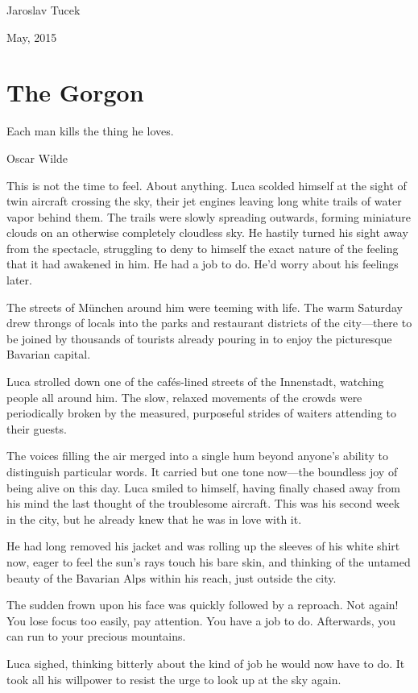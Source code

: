 \hfill Jaroslav Tucek

\hfill May, 2015

\chapter{The Gorgon}

\epigraph{Each man kills the thing he loves.}{Oscar Wilde}

\firstparagraph

This is not the time to feel. About anything. Luca scolded himself at the sight of twin aircraft crossing the sky, their jet engines leaving long white trails of water vapor behind them. The trails were slowly spreading outwards, forming miniature clouds on an otherwise completely cloudless sky. He hastily turned his sight away from the spectacle, struggling to deny to himself the exact nature of the feeling that it had awakened in him. He had a job to do. He'd worry about his feelings later.

The streets of München around him were teeming with life. The warm Saturday drew throngs of locals into the parks and restaurant districts of the city---there to be joined by thousands of tourists already pouring in to enjoy the picturesque Bavarian capital.

Luca strolled down one of the cafés-lined streets of the Innenstadt, watching people all around him. The slow, relaxed movements of the crowds were periodically broken by the measured, purposeful strides of waiters attending to their guests.

The voices filling the air merged into a single hum beyond anyone's ability to distinguish particular words. It carried but one tone now---the boundless joy of being alive on this day. Luca smiled to himself, having finally chased away from his mind the last thought of the troublesome aircraft. This was his second week in the city, but he already knew that he was in love with it.

He had long removed his jacket and was rolling up the sleeves of his white shirt now, eager to feel the sun's rays touch his bare skin, and thinking of the untamed beauty of the Bavarian Alps within his reach, just outside the city.

The sudden frown upon his face was quickly followed by a reproach. Not again! You lose focus too easily, pay attention. You have a job to do. Afterwards, you can run to your precious mountains.

Luca sighed, thinking bitterly about the kind of job he would now have to do. It took all his willpower to resist the urge to look up at the sky again.


